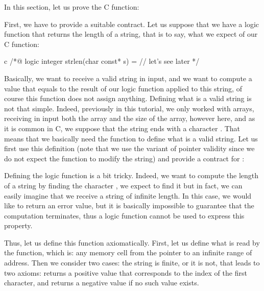 

In this section, let us prove the C  function:




First, we have to provide a suitable contract. Let us suppose that we
have a logic function  that returns the length of a
string, that is to say, what we expect of our C function:


\begin{CodeBlock}{c}
/*@
  logic integer strlen(char const* s) = // let's see later
*/
\end{CodeBlock}



Basically, we want to receive a valid string in input, and we want to
compute a value that equals to the result of our logic function
 applied to this string, of course this function
does not assign anything. Defining what is a valid string is not that
simple. Indeed, previously in this tutorial, we only worked with
arrays, receiving in input both the array and the size of the array,
however here, and as it is common in C, we suppose that the string ends
with a character . That means that we
basically need the  function to define what is a
valid string. Let us first use this definition (note that we use the
 variant of pointer validity
since we do not expect the function to modify the string) and provide
a contract for :






Defining the logic function  is a bit tricky. Indeed,
we want to compute the length of a string by finding the character
, we expect to find it but in fact, we
can easily imagine that we receive a string of infinite length. In this case,
we would like to return an error value, but it is basically impossible to
guarantee that the computation terminates, thus a logic function cannot
be used to express this property.



Thus, let us define this function axiomatically. First, let us define what
is read by the function, which is: any memory cell from the pointer to an
infinite range of address. Then we consider two cases: the string is
finite, or it is not, that leads to two axioms:  returns
a positive value that corresponds to the index of the first
 character, and returns a negative value if
no such value exists.



